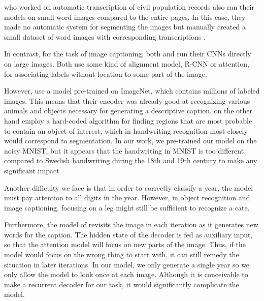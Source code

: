 \textcite{FornesCnnCategorization} who worked on automatic transcription of civil population records also ran their models on small word images compared to the entire pages. In this case, they made no automatic system for segmenting the images but manually created a small dataset of word images with corresponding transcriptions \cite{esposalles}.

In contrast, for the task of image captioning, both \textcite{AttendAndTell} and \textcite{VisualSemanticAlignment} run their CNNs directly on large images. Both use some kind of alignment model, R-CNN or attention, for associating labels without location to some part of the image.

However, \textcite{AttendAndTell} use a model pre-trained on ImageNet, which contains millions of labeled images. This means that their encoder was already good at recognizing various animals and objects necessary for generating a descriptive caption. \textcite{VisualSemanticAlignment} on the other hand employ a hard-coded algorithm for finding regions that are most probable to contain an object of interest, which in handwriting recognition most closely would correspond to segmentation.
In our work, we pre-trained our model on the noisy MNIST, but it appears that the handwriting in MNIST is too different compared to Swedish handwriting during the 18th and 19th century to make any significant impact.

Another difficulty we face is that in order to correctly classify a year, the model must pay attention to all digits in the year. However, in object recognition and image captioning, focusing on a leg might still be sufficient to recognize a cate.

Furthermore, the model of \textcite{AttendAndTell} revisits the image in each iteration as it generates new words for the caption. The hidden state of the decoder is fed as auxiliary input, so that the attention model will focus on new parts of the image. Thus, if the model would focus on the wrong thing to start with, it can still remedy the situation in later iterations.
In our model, we only generate a single year so we only allow the model to look once at each image. Although it is conceivable to make a recurrent decoder for our task, it would significantly complicate the model.



